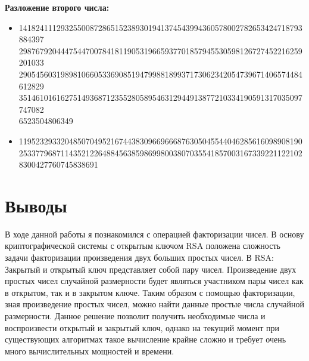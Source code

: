 \documentclass[pdf, unicode, 12pt, a4paper,oneside,fleqn]{article}
\begin{document}
{\bfseries Разложение второго числа:}
\begin{itemize}
    \item 
    14182411129325500872865152389301941374543994360578002782653424718793884397\\
    29876792044475447007841811905319665937701857945530598126727452216259201033\\
    29054560319898106605336908519479988189937173062342054739671406574484612829\\
    35146101616275149368712355280589546312944913877210334190591317035097747082\\
    6523504806349
    \item 11952329332048507049521674438309669666876305045544046285616098908190\\
    25337796871143521226488456385986998003807035541857003167339221122102\\
    8300427760745838691
\end{itemize}

\pagebreak

\section{Выводы}
В ходе данной работы я познакомился с операцией факторизации чисел. В основу криптографической системы с открытым ключом RSA положена сложность задачи факторизации произведения двух больших простых чисел.
В RSA: Закрытый и открытый ключ представляет собой пару чисел. Произведение двух простых чисел случайной размерности будет являться участником пары чисел как в открытом, так и в закрытом ключе.
\newline
Таким образом с помощью факторизации, зная произведение простых чисел, можно найти данные простые числа случайной размерности. Данное решение позволит получить необходимые числа и воспроизвести открытый и закрытый ключ, однако на текущий момент при существующих алгоритмах такое вычисление крайне сложно и требует очень много вычислительных мощностей и времени.
\pagebreak
\end{document}
